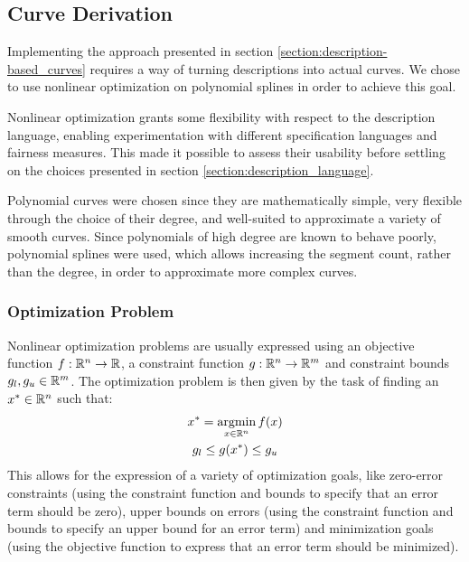 \documentclass[a4paper]{article}
\begin{document}
		\subsection{Curve Derivation}
		\label{section:curve_derivation}

			Implementing the approach presented in section \ref{section:description-based_curves} requires a way of turning descriptions into actual curves. We chose to use nonlinear optimization on polynomial splines in order to achieve this goal.

			Nonlinear optimization grants some flexibility with respect to the description language, enabling experimentation with different specification languages and fairness measures. This made it possible to assess their usability before settling on the choices presented in section \ref{section:description_language}.

			Polynomial curves were chosen since they are mathematically simple, very flexible through the choice of their degree, and well-suited to approximate a variety of smooth curves. Since polynomials of high degree are known to behave poorly, polynomial splines were used, which allows increasing the segment count, rather than the degree, in order to approximate more complex curves.

			\subsubsection{Optimization Problem}
			\label{section:optimization_problem}

				Nonlinear optimization problems are usually expressed using an objective function \(f : \mathbb{R}^{n} \rightarrow \mathbb{R}\), a constraint function \(g : \mathbb{R}^{n} \rightarrow \mathbb{R}^{m}\) and constraint bounds \(g_l, g_u \in \mathbb{R}^{m}\). The optimization problem is then given by the task of finding an \(x^* \in \mathbb{R}^{n}\) such that:
				\begin{equation*}
					\begin{gathered}
						x^* = \operatorname*{argmin}_{x \in \mathbb{R}^{n}} f\!\left( x \right)\\
						g_l \leq g\!\left( x^* \right) \leq g_u
					\end{gathered}
				\end{equation*}
				This allows for the expression of a variety of optimization goals, like zero-error constraints (using the constraint function and bounds to specify that an error term should be zero), upper bounds on errors (using the constraint function and bounds to specify an upper bound for an error term) and minimization goals (using the objective function to express that an error term should be minimized).
\end{document}
